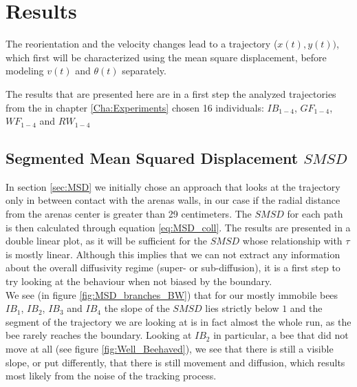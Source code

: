 \chapter{Results}
\label{cha:Results}

The reorientation and the velocity changes lead to a trajectory ($x(t), y(t))$, which first will be characterized using the mean square displacement, before modeling $v(t)$ and $\theta(t)$ separately.

The results that are presented here are in a first step the analyzed trajectories from the in chapter \ref{Cha:Experiments} chosen 16 individuals: $IB_{1-4}$, $GF_{1-4}$, $WF_{1-4}$ and $RW_{1-4}$

\section{Segmented Mean Squared Displacement $SMSD$}
\label{sec:SMSD}

In section \ref{sec:MSD} we initially chose an approach that looks at the trajectory only in between contact with the arenas walls, in our case if the radial distance from the arenas center is greater than 29 centimeters. The $SMSD$ for each path is then calculated through equation \ref{eq:MSD_coll}.
The results are presented in a double linear plot, as it will be sufficient for the $SMSD$ whose relationship with $\tau$ is mostly linear. Although this implies that we can not extract any information about the overall diffusivity regime (super- or sub-diffusion), it is a first step to try looking at the behaviour when not biased by the boundary.
\\
We see (in figure \ref{fig:MSD_branches_BW}) that for our mostly immobile bees $IB_1$, $IB_2$, $IB_3$ and $IB_4$ the slope of the $SMSD$ lies strictly below $1$ and the segment of the trajectory we are looking at is in fact almost the whole run, as the bee rarely reaches the boundary. Looking at $IB_2$ in particular, a bee that did not move at all (see figure \ref{fig:Well_Beehaved}), we see that there is still a visible slope, or put differently, that there is still movement and diffusion, which results most likely from the noise of the tracking process.

